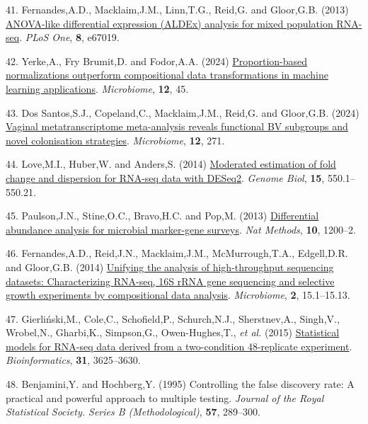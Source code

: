 \documentclass[
]{article}
\newlength{\cslhangindent}
\newenvironment{CSLReferences}[2] %
 {\begin{list}{}{%
  \setlength{\itemindent}{0pt}
  \setlength{\leftmargin}{0pt}
  \setlength{\parsep}{0pt}
  \ifodd #1
   \setlength{\leftmargin}{\cslhangindent}
   \setlength{\itemindent}{-1\cslhangindent}
  \fi
  \setlength{\itemsep}{#2\baselineskip}}}
 {\end{list}}
\begin{document}
\begin{CSLReferences}{1}{1}
41. Fernandes,A.D., Macklaim,J.M., Linn,T.G., Reid,G. and Gloor,G.B.
(2013) \href{https://doi.org/10.1371/journal.pone.0067019}{{ANOVA}-like
differential expression (ALDEx) analysis for mixed population
{RNA}-seq}. \emph{PLoS One}, \textbf{8}, e67019.

42. Yerke,A., Fry Brumit,D. and Fodor,A.A. (2024)
\href{https://doi.org/10.1186/s40168-023-01747-z}{Proportion-based
normalizations outperform compositional data transformations in machine
learning applications}. \emph{Microbiome}, \textbf{12}, 45.

43. Dos Santos,S.J., Copeland,C., Macklaim,J.M., Reid,G. and Gloor,G.B.
(2024) \href{https://doi.org/10.1186/s40168-024-01992-w}{Vaginal
metatranscriptome meta-analysis reveals functional {BV} subgroups and
novel colonisation strategies}. \emph{Microbiome}, \textbf{12}, 271.

44. Love,M.I., Huber,W. and Anders,S. (2014)
\href{https://doi.org/10.1186/s13059-014-0550-8}{Moderated estimation of
fold change and dispersion for RNA-seq data with DESeq2}. \emph{Genome
Biol}, \textbf{15}, 550.1--550.21.

45. Paulson,J.N., Stine,O.C., Bravo,H.C. and Pop,M. (2013)
\href{https://doi.org/10.1038/nmeth.2658}{Differential abundance
analysis for microbial marker-gene surveys}. \emph{Nat Methods},
\textbf{10}, 1200--2.

46. Fernandes,A.D., Reid,J.N., Macklaim,J.M., McMurrough,T.A.,
Edgell,D.R. and Gloor,G.B. (2014)
\href{https://doi.org/10.1186/2049-2618-2-15}{Unifying the analysis of
high-throughput sequencing datasets: Characterizing {RNA}-seq, 16{S}
r{RNA} gene sequencing and selective growth experiments by compositional
data analysis}. \emph{Microbiome}, \textbf{2}, 15.1--15.13.

47. Gierliński,M., Cole,C., Schofield,P., Schurch,N.J., Sherstnev,A.,
Singh,V., Wrobel,N., Gharbi,K., Simpson,G., Owen-Hughes,T., \emph{et
al.} (2015)
\href{https://doi.org/10.1093/bioinformatics/btv425}{Statistical models
for RNA-seq data derived from a two-condition 48-replicate experiment}.
\emph{Bioinformatics}, \textbf{31}, 3625--3630.

48. Benjamini,Y. and Hochberg,Y. (1995) Controlling the false discovery
rate: A practical and powerful approach to multiple testing.
\emph{Journal of the Royal Statistical Society. Series B
(Methodological)}, \textbf{57}, 289--300.


\end{CSLReferences}
\end{document}
